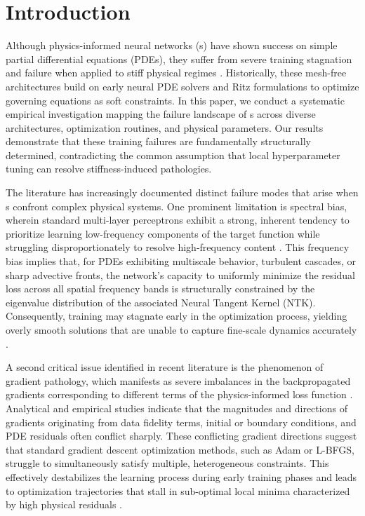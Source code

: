 \section{Introduction}

Although physics-informed neural networks (\PINN{}s) have shown success on simple partial differential equations (PDEs), they suffer from severe training stagnation and failure when applied to stiff physical regimes \cite{Raissi2019, Cuomo2022review}. Historically, these mesh-free architectures build on early neural PDE solvers \cite{Lagaris1998} and Ritz formulations \cite{E2018deepritz} to optimize governing equations as soft constraints. In this paper, we conduct a systematic empirical investigation mapping the failure landscape of \PINN{}s across diverse architectures, optimization routines, and physical parameters. Our results demonstrate that these training failures are fundamentally structurally determined, contradicting the common assumption that local hyperparameter tuning can resolve stiffness-induced pathologies.

The literature has increasingly documented distinct failure modes that arise when \PINN{}s confront complex physical systems. One prominent limitation is spectral bias, wherein standard multi-layer perceptrons exhibit a strong, inherent tendency to prioritize learning low-frequency components of the target function while struggling disproportionately to resolve high-frequency content \cite{Wang2021gradpathology}. This frequency bias implies that, for PDEs exhibiting multiscale behavior, turbulent cascades, or sharp advective fronts, the network's capacity to uniformly minimize the residual loss across all spatial frequency bands is structurally constrained by the eigenvalue distribution of the associated Neural Tangent Kernel (NTK). Consequently, training may stagnate early in the optimization process, yielding overly smooth solutions that are unable to capture fine-scale dynamics accurately \cite{Wang2021gradpathology}.

A second critical issue identified in recent literature is the phenomenon of gradient pathology, which manifests as severe imbalances in the backpropagated gradients corresponding to different terms of the physics-informed loss function \cite{Wang2021gradpathology}. Analytical and empirical studies indicate that the magnitudes and directions of gradients originating from data fidelity terms, initial or boundary conditions, and PDE residuals often conflict sharply. These conflicting gradient directions suggest that standard gradient descent optimization methods, such as Adam or L-BFGS, struggle to simultaneously satisfy multiple, heterogeneous constraints. This effectively destabilizes the learning process during early training phases and leads to optimization trajectories that stall in sub-optimal local minima characterized by high physical residuals \cite{Wang2021gradpathology, Wang2022causal}.

